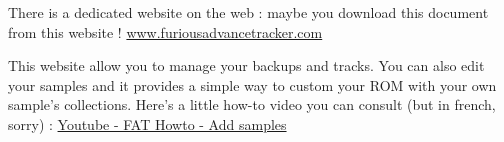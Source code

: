 
There is a \FAT dedicated website on the web : maybe you download this document from this website !
\href{http://www.furiousadvancetracker.com}{www.furiousadvancetracker.com}
\medskip

This website allow you to manage your backups and tracks. You can also edit your samples and it provides a simple way to custom your ROM with your own sample's collections.
Here's a little how-to video you can consult (but in french, sorry) :
\href{https://www.youtube.com/watch?v=a9rPzz-6Mgg}{Youtube - FAT Howto - Add samples}
\medskip

